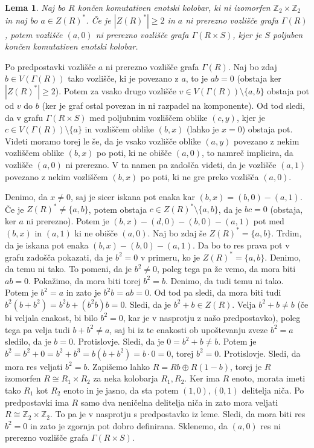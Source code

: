 \documentclass[a4paper, 12pt]{amsart}
\theoremstyle{definition} %
\theoremstyle{plain} %
\newtheorem{lema}[definicija]{Lema}
\newcommand{\Z}{\mathbb Z}
\begin{document}
\begin{lema}
Naj bo $R$ končen komutativen enotski kolobar, ki ni izomorfen $\Z_2 \times \Z_2$ in naj bo $a\in Z(R)^*$. Če je $|Z(R)^*| \ge 2$ in $a$ ni prerezno vozlišče grafa $\Gamma(R)$, potem vozlišče $(a,0)$ ni prerezno vozlišče grafa $\Gamma(R\times S)$, kjer je $S$ poljuben končen komutativen enotski kolobar.
\end{lema}

\proof
Po predpostavki vozlišče $a$ ni prerezno vozlišče grafa $\Gamma(R)$. Naj bo zdaj $b \in V(\Gamma(R))$ tako vozlišče, ki je povezano z $a$, to je $ab = 0$ (obstaja ker $|Z(R)^*|\ge 2$). Potem za vsako drugo vozlišče $v\in V(\Gamma(R)) \setminus \{a,b\}$ obstaja pot od $v$ do $b$ (ker je  graf ostal povezan in ni razpadel na komponente). Od tod sledi, da v grafu $\Gamma(R\times S)$ med poljubnim vozliščem oblike $(c,y)$, kjer je $c\in V( \Gamma(R))\setminus \{a\}$ in vozliščem oblike $(b,x)$ (lahko je $x=0$) obstaja pot. Videti moramo torej le še, da je vsako vozlišče oblike $(a,y)$ povezano z nekim vozliščem oblike $(b,x)$ po poti, ki ne obišče $(a,0)$, to namreč implicira, da vozlišče $(a,0)$ ni prerezno. V ta namen pa zadošča videti, da je vozlišče $(a,1)$ povezano z nekim vozliščem $(b,x)$ po poti, ki ne gre preko vozlišča $(a,0)$. 

Denimo, da $x\neq 0$, saj je sicer iskana pot enaka kar $(b,x) = (b,0) - (a,1)$.
Če je $Z(R)^* \neq \{a,b\}$, potem obstaja $c\in Z(R)^* \setminus \{a,b\}$, da je $bc=0$ (obstaja, ker $a$ ni prerezno). Potem je $(b,x) - (d,0) - (b,0) - (a,1)$ pot med $(b,x)$ in $(a,1)$ ki ne obišče $(a,0)$. Naj bo zdaj še $Z(R)^* = \{a,b\}$. Trdim, da je iskana pot enaka $(b,x) - (b,0) - (a,1)$. Da bo to res prava pot v grafu zadošča pokazati, da je $b^2 = 0$ v primeru, ko je $Z(R)^* = \{a,b\}$. Denimo, da temu ni tako. To pomeni, da je $b^2 \neq 0$, poleg tega pa že vemo, da mora biti $ab=0$. Pokažimo, da mora biti torej $b^2  = b$. Denimo, da tudi temu ni tako. Potem je $b^2 = a$ in zato je $b^2 b = a b = 0$. Od tod pa sledi, da mora biti tudi $b^2 (b+b^2) = b^2 b + (b^2 b)b  = 0$. Sledi, da je $b^2 + b\in Z(R)$. Velja $b^2 + b\neq b$ (če bi veljala enakost, bi bilo $b^2 = 0$, kar je v nasprotju z našo predpostavko), poleg tega pa velja tudi $b+b^2 \neq a$, saj bi iz te enakosti ob upoštevanju zveze $b^2 = a$ sledilo, da je $b = 0$. Protislovje. Sledi, da je $0=b^2 + b\neq b $. Potem je $b^2 = b^2 + 0 = b^2 + b^3 = b(b+b^2) = b\cdot 0 = 0$, torej $b^2 = 0$. Protislovje. Sledi, da mora res veljati $b^2 = b$. Zapišemo lahko $R=Rb \oplus R(1-b)$, torej je $R$ izomorfen $R\cong R_1\times R_2$ za neka kolobarja $R_1,R_2$. Ker ima $R$ enoto, morata imeti tako $R_1$ kot $R_2$ enoto in je jasno, da sta potem $(1,0),(0,1)$ delitelja niča. Po predpostavki ima $R$ samo dva neničelna delitelja niča in zato mora veljati $R\cong \Z_2 \times \Z_2$. To pa je v nasprotju s predpostavko iz leme. Sledi, da mora biti res $b^2 = 0$ in zato je zgornja pot dobro definirana. Sklenemo, da $(a,0)$ res ni prerezno vozlišče grafa $\Gamma(R\times S)$.
\endproof
\end{document}
